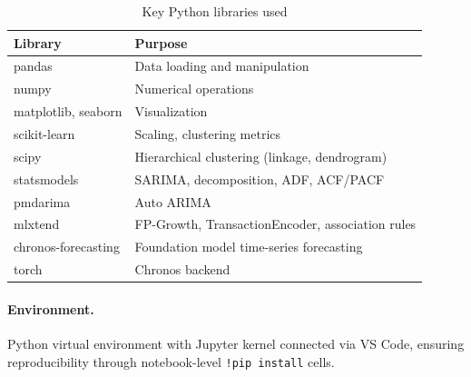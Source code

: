 \documentclass[11pt,a4paper]{article}
\begin{document}
\begin{table}[H]
\centering
\begin{tabular}{ll}
\toprule
\textbf{Library} & \textbf{Purpose} \\
\midrule
pandas & Data loading and manipulation \\
numpy & Numerical operations \\
matplotlib, seaborn & Visualization \\
scikit-learn & Scaling, clustering metrics \\
scipy & Hierarchical clustering (linkage, dendrogram) \\
statsmodels & SARIMA, decomposition, ADF, ACF/PACF \\
pmdarima & Auto ARIMA \\
mlxtend & FP-Growth, TransactionEncoder, association rules \\
chronos-forecasting & Foundation model time-series forecasting \\
torch & Chronos backend \\
\bottomrule
\end{tabular}
\caption{Key Python libraries used}
\end{table}

\paragraph{Environment.} Python virtual environment with Jupyter kernel connected via VS Code, ensuring reproducibility through notebook-level \texttt{!pip install} cells.
\end{document}
